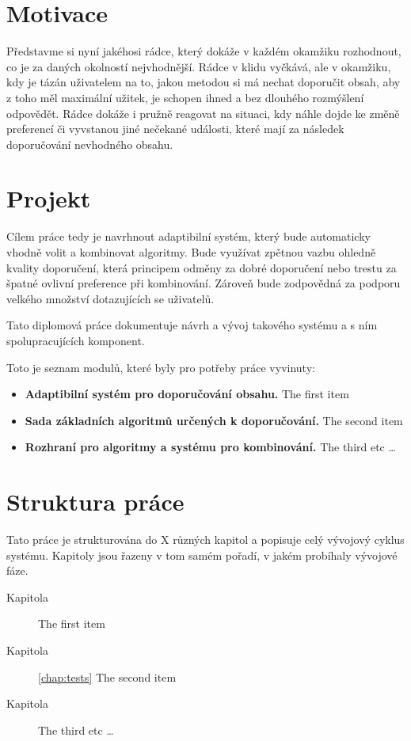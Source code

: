 \documentclass[thesis=M,czech]{FITthesis}[2014/05/07]
\begin{document}
\begin{introduction}
	\section{Motivace} 	
		
	Představme si nyní jakéhosi rádce, který dokáže v každém okamžiku rozhodnout, co je za daných okolností nejvhodnější. Rádce v klidu vyčkává, ale v okamžiku, kdy je tázán uživatelem na to, jakou metodou si má nechat doporučit obsah, aby z toho měl maximální užitek, je schopen ihned a bez dlouhého rozmýšlení odpovědět. Rádce dokáže i pružně reagovat na situaci, kdy náhle dojde ke změně preferencí či vyvstanou jiné nečekané události, které mají za následek doporučování nevhodného obsahu.
	
	\section{Projekt}
	Cílem práce tedy je navrhnout adaptibilní systém, který bude automaticky vhodně volit a kombinovat algoritmy. Bude využívat zpětnou vazbu ohledně kvality doporučení, která principem odměny za dobré doporučení nebo trestu za špatné ovlivní preference při kombinování. Zároveň bude zodpovědná za podporu velkého množství dotazujících se uživatelů.	
	
	Tato diplomová práce dokumentuje návrh a vývoj takového systému a s ním spolupracujících komponent.	
	
	Toto je seznam modulů, které byly pro potřeby práce vyvinuty:

\begin{itemize}
  \item \textbf{Adaptibilní systém pro doporučování obsahu.} The first item
  \item \textbf{Sada základních algoritmů určených k doporučování.} The second item
  \item \textbf{Rozhraní pro algoritmy a systému pro kombinování.} The third etc \ldots
\end{itemize}	

	\section{Struktura práce}
	Tato práce je strukturována do X různých kapitol a popisuje celý vývojový cyklus systému. Kapitoly jsou řazeny v tom samém pořadí, v jakém probíhaly vývojové fáze.	

\begin{description}
  \item[Kapitola]  The first item
  \item[Kapitola] \ref{chap:tests} The second item
  \item[Kapitola] The third etc \ldots
\end{description}
	
\end{introduction}
\end{document}
